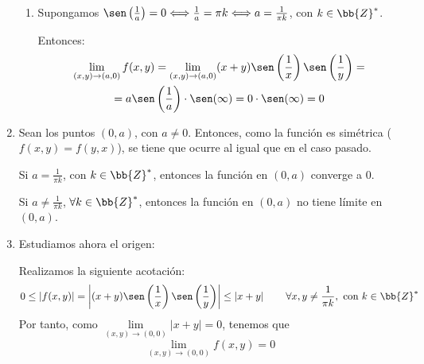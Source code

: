 \begin{ejercicio}
\begin{enumerate}
\begin{enumerate}
            \item Supongamos $\sen\left(\frac{1}{a}\right)= 0\Longleftrightarrow \frac{1}{a}= \pi k\Longleftrightarrow a= \frac{1}{\pi k}$, con $k\in \bb{Z}^\ast$.

            Entonces:
            \begin{multline*}
                \lim_{(x,y)\to (a,0)}f(x,y)
                = \lim_{(x,y)\to (a,0)} (x+y)\sen\left(\frac{1}{x}\right)\sen\left(\frac{1}{y}\right) =\\= a\sen\left(\frac{1}{a}\right)\cdot \sen(\infty) = 0\cdot \sen(\infty)=0
            \end{multline*}
        \end{enumerate}

        \item Sean los puntos $(0,a)$, con $a\neq 0$. Entonces, como la función es simétrica ($f(x,y)=f(y,x)$), se tiene que ocurre al igual que en el caso pasado. 

        Si $a=\frac{1}{\pi k}$,  con $k \in \bb{Z}^\ast$, entonces la función en $(0,a)$ converge a $0$.

        Si $a\neq \frac{1}{\pi k}$, $\forall k\in \bb{Z}^\ast$, entonces la función en $(0,a)$ no tiene límite en $(0,a)$.

        \item Estudiamos ahora el origen:

        Realizamos la siguiente acotación:
        \begin{equation*}
            0\leq \left|f(x,y)\right|
            = \left|(x+y)\sen\left(\frac{1}{x}\right)\sen\left(\frac{1}{y}\right)\right|
            \leq \left|x+y\right| \qquad \forall x,y\neq \frac{1}{\pi k},\text{ con }k\in \bb{Z}^\ast
        \end{equation*}
        Por tanto, como $\lim\limits_{(x,y)\to (0,0)}|x+y|=0$, tenemos que 
        $$\lim\limits_{(x,y)\to (0,0)}f(x,y)=0$$
        
    \end{enumerate}
\end{ejercicio}


